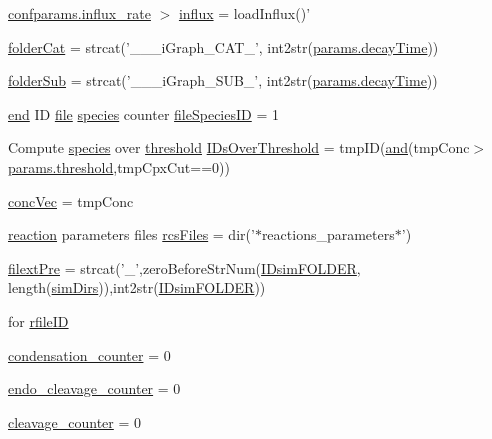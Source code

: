 \begin{DoxyCompactItemize}
\hyperlink{a00113_ad795c71664f3161dc8f7a769341daadf}{confparams.\-influx\-\_\-rate} $>$ \hyperlink{a00028_a637d2af7e7b03600bcaf1931b999e3fc}{influx} = load\-Influx()'
\item 
\hyperlink{a00028_ac4793cb55101110d228ded89ce9caa48}{folder\-Cat} = strcat('\-\_\-\-\_\-\_\-i\-Graph\-\_\-\-C\-A\-T\-\_\-', int2str(\hyperlink{a00036_afb6aa83fb78c663f3b39be2380842a8b}{params.\-decay\-Time}))
\item 
\hyperlink{a00028_a05c5bf0305e5d58d4dc25bd89a025678}{folder\-Sub} = strcat('\-\_\-\-\_\-\_\-i\-Graph\-\_\-\-S\-U\-B\-\_\-', int2str(\hyperlink{a00036_afb6aa83fb78c663f3b39be2380842a8b}{params.\-decay\-Time}))
\item 
\hyperlink{a00025_afb358f48b1646c750fb9da6c6585be2b}{end} I\-D \hyperlink{a00110_a4e8353d6c62cf54bf4a1a8f63e56b8c3}{file} \hyperlink{a00022}{species} counter \hyperlink{a00028_aac959c2e94c26a03fa03966f9cec127e}{file\-Species\-I\-D} = 1
\item 
Compute \hyperlink{a00022}{species} over \hyperlink{a00036_aa022cbb28f80299d572def08e7a5ccfd}{threshold} \hyperlink{a00028_a67c695f856b6731644c6a128e602a323}{I\-Ds\-Over\-Threshold} = tmp\-I\-D(\hyperlink{a00028_a170f8acb213f91bf71c77b1d20bceb33}{and}(tmp\-Conc$>$\hyperlink{a00036_aa022cbb28f80299d572def08e7a5ccfd}{params.\-threshold},tmp\-Cpx\-Cut==0))
\item 
\hyperlink{a00028_a5cb5865443d8f156213280c070385e0d}{conc\-Vec} = tmp\-Conc
\item 
\hyperlink{a00028_a4ba2ecb46f808729569ecce2cc1d34c6}{reaction} parameters files \hyperlink{a00028_aa7a414dad4901fc05688608a49adfd7e}{rcs\-Files} = dir('$\ast$reactions\-\_\-parameters$\ast$')
\item 
\hyperlink{a00028_a527736a425f4f7ead2c2dc9d7b479346}{filext\-Pre} = strcat('\-\_\-',zero\-Before\-Str\-Num(\hyperlink{a00028_aeef3e34bd64eec758eac16f004cdcef0}{I\-Dsim\-F\-O\-L\-D\-E\-R}, length(\hyperlink{a00031_aae5035eb84b89176ed5b06e136325eff}{sim\-Dirs})),int2str(\hyperlink{a00028_aeef3e34bd64eec758eac16f004cdcef0}{I\-Dsim\-F\-O\-L\-D\-E\-R}))
\item 
for \hyperlink{a00028_a2773ef160060ce8adead229154219112}{rfile\-I\-D}
\item 
\hyperlink{a00028_adad395e0a0c736c2818d52c1100d4f31}{condensation\-\_\-counter} = 0
\item 
\hyperlink{a00028_aac101310701750e7d113b83271c1b982}{endo\-\_\-cleavage\-\_\-counter} = 0
\item 
\hyperlink{a00028_ab1f4c307f0935bb99adb3036a2936b5e}{cleavage\-\_\-counter} = 0

\end{DoxyCompactItemize}
